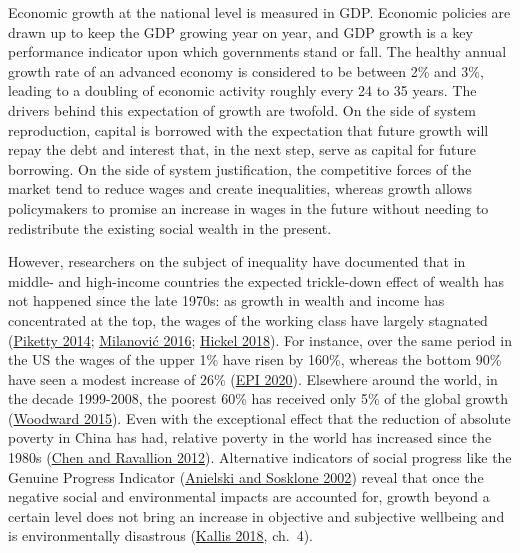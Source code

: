 \documentclass[a4paper, nobind]{templates/ociamthesis}
\begin{document}
Economic growth at the national level is measured in GDP. Economic policies are drawn up to keep the GDP growing year on year, and GDP growth is a key performance indicator upon which governments stand or fall. The healthy annual growth rate of an advanced economy is considered to be between 2\% and 3\%, leading to a doubling of economic activity roughly every 24 to 35 years. The drivers behind this expectation of growth are twofold. On the side of system reproduction, capital is borrowed with the expectation that future growth will repay the debt and interest that, in the next step, serve as capital for future borrowing. On the side of system justification, the competitive forces of the market tend to reduce wages and create inequalities, whereas growth allows policymakers to promise an increase in wages in the future without needing to redistribute the existing social wealth in the present.

However, researchers on the subject of inequality have documented that in middle- and high-income countries the expected trickle-down effect of wealth has not happened since the late 1970s: as growth in wealth and income has concentrated at the top, the wages of the working class have largely stagnated (\protect\hyperlink{ref-piketty_capital_2014}{Piketty 2014}; \protect\hyperlink{ref-milanovic_global_2016}{Milanović 2016}; \protect\hyperlink{ref-hickel_divide_2018}{Hickel 2018}). For instance, over the same period in the US the wages of the upper 1\% have risen by 160\%, whereas the bottom 90\% have seen a modest increase of 26\% (\protect\hyperlink{ref-epi_wages_2020}{EPI 2020}). Elsewhere around the world, in the decade 1999-2008, the poorest 60\% has received only 5\% of the global growth (\protect\hyperlink{ref-woodward_incrementum_2015}{Woodward 2015}). Even with the exceptional effect that the reduction of absolute poverty in China has had, relative poverty in the world has increased since the 1980s (\protect\hyperlink{ref-chen_policy_2012}{Chen and Ravallion 2012}). Alternative indicators of social progress like the Genuine Progress Indicator (\protect\hyperlink{ref-anielski_genuine_2002}{Anielski and Sosklone 2002}) reveal that once the negative social and environmental impacts are accounted for, growth beyond a certain level does not bring an increase in objective and subjective wellbeing and is environmentally disastrous (\protect\hyperlink{ref-kallis_degrowth_2018}{Kallis 2018}, ch.~4).
\end{document}
